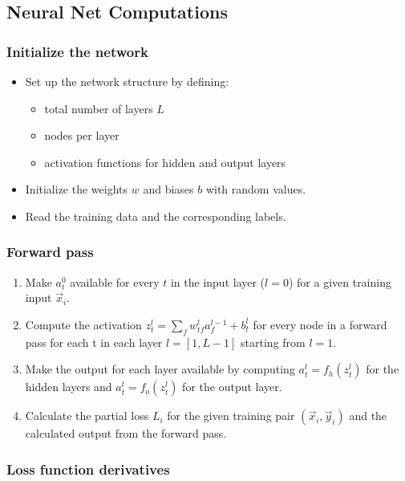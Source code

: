 \subsection{Neural Net Computations}

\subsubsection*{Initialize the network}

\begin{itemize}
    \item Set up the network structure by defining:
    \begin{itemize}
        \item total number of layers $L$
        \item nodes per layer
        \item activation functions for hidden and output layers
    \end{itemize}
    \item Initialize the weights $w$ and biases $b$ with random values.
    \item Read the training data and the corresponding labels.
\end{itemize}

\subsubsection*{Forward pass}

\begin{enumerate}
    \item Make $a_t^0$ available for every $t$ in the input layer ($l=0$) for a given
    training input $\vec{x}_i$.
    \item Compute the activation $z_t^l = \sum\limits_{f} w_{tf}^l a_f^{l-1} + b_t^l$ for
    every node in a forward pass for each t in each layer $l = [1,L-1]$ starting from
    $l=1$.
    \item Make the output for each layer available by computing $a_t^l = f_h(z_t^l)$ for
    the hidden layers and $a_t^l = f_o(z_t^l)$ for the output layer.
    \item Calculate the partial loss $L_i$ for the given training pair $(\vec{x}_i,
    \vec{y}_i)$ and the calculated output from the forward pass.
\end{enumerate}

\subsubsection*{Loss function derivatives}

